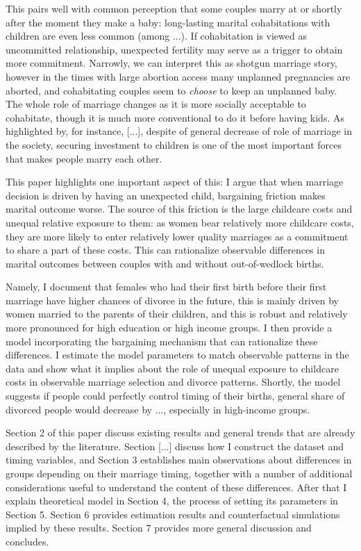 \documentclass[12pt,letter]{article}
\begin{document}
This pairs well with common perception that some couples marry at or shortly after the moment they make a baby: long-lasting marital cohabitations with children are even less common (among ...). If cohabitation is viewed as uncommitted relationship, unexpected fertility may serve as a trigger to obtain more commitment. Narrowly, we can interpret this as shotgun marriage story, however in the times with large abortion access many unplanned pregnancies are aborted, and cohabitating couples seem to \emph{choose} to keep an unplanned baby. The whole role of marriage changes as it is more socially acceptable to cohabitate, though it is much more conventional to do it before having kids. As highlighted by, for instance, [...], despite of general decrease of role of marriage in the society, securing investment to children is one of the most important forces that makes people marry each other.

This paper highlights one important aspect of this: I argue that when marriage decision is driven by having an unexpected child, bargaining friction makes marital outcome worse. The source of this friction is the large childcare costs and unequal relative exposure to them: as women bear relatively more childcare costs, they are more likely to enter relatively lower quality marriages as a commitment to share a part of these costs. This can rationalize observable differences in marital outcomes between couples with and without out-of-wedlock births. 

Namely, I document that females who had their first birth before their first marriage have higher chances of divorce in the future, this is mainly driven by women married to the parents of their children, and this is robust and relatively more pronounced for high education or high income groups. I then provide a model incorporating the bargaining mechanism that can rationalize these differences. I estimate the model parameters to match observable patterns in the data and show what it implies about the role of unequal exposure to childcare costs in observable marriage selection and divorce patterns. Shortly, the model suggests if people could perfectly control timing of their births, general share of divorced people would decrease by ..., especially in high-income groups.

Section 2 of this paper discuss existing results and general trends that are already described by the literature. Section [...] discuss how I construct the dataset and timing variables, and Section 3 establishes main observations about differences in groups depending on their marriage timing, together with a number of additional considerations useful to understand the content of these differences. After that I explain theoretical model in Section 4, the process of setting its parameters in Section 5. Section 6 provides estimation results and counterfactual simulations implied by these results. Section 7 provides more general discussion and concludes.
\end{document}
